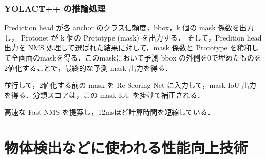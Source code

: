 \documentclass[twocolumn]{jsarticle} %
\begin{document}
\subsubsection{YOLACT++ の推論処理}
Prediction head が各 anchor のクラス信頼度，bbox，k 個の mask 係数を出力し，
Protonet が k 個の Prototype (mask) を出力する．
そして，Predition head 出力を NMS 処理して選ばれた結果に対して，mask 係数と Prototype を積和して全画面のmaskを得る．このmaskにおいて予測 bbox の外側を0で埋めたものを2値化することで，最終的な予測 mask 出力を得る．

並行して，2値化する前の mask を Re-Scoring Net に入力して，mask IoU 出力を得る．分類スコアは，この mask IoU を掛けて補正される．

高速な Fast NMS を提案し，12msほど計算時間を短縮している．
\section{物体検出などに使われる性能向上技術}
\end{document}
